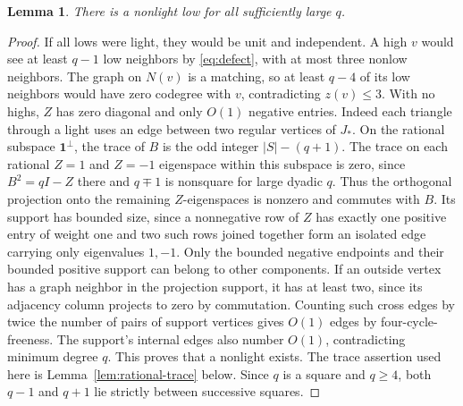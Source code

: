 \documentclass[11pt,reqno]{amsart}
\newtheorem{lemma}[theorem]{Lemma}
\theoremstyle{definition}
\theoremstyle{remark}
\numberwithin{equation}{section}
\begin{document}
\begin{lemma}\label{lem:nonlight}
There is a nonlight low for all sufficiently large \(q\).
\end{lemma}
\begin{proof} If all lows were light, they would be unit and independent. A high \(v\) would see at least \(q-1\) low neighbors by \eqref{eq:defect}, with at most three nonlow neighbors. The graph on \(N(v)\) is a matching, so at least \(q-4\) of its low neighbors would have zero codegree with \(v\), contradicting \(z(v)\le3\). With no highs, \(Z\) has zero diagonal and only \(O(1)\) negative entries. Indeed each triangle through a light uses an edge between two regular vertices of \(J_*\). On the rational subspace \(\mathbf1^\perp\), the trace of \(B\) is the odd integer \(|S|-(q+1)\). The trace on each rational \(Z=1\) and \(Z=-1\) eigenspace within this subspace is zero, since \(B^2=qI-Z\) there and \(q\mp1\) is nonsquare for large dyadic \(q\). Thus the orthogonal projection onto the remaining \(Z\)-eigenspaces is nonzero and commutes with \(B\). Its support has bounded size, since a nonnegative row of \(Z\) has exactly one positive entry of weight one and two such rows joined together form an isolated edge carrying only eigenvalues \(1,-1\). Only the bounded negative endpoints and their bounded positive support can belong to other components. If an outside vertex has a graph neighbor in the projection support, it has at least two, since its adjacency column projects to zero by commutation. Counting such cross edges by twice the number of pairs of support vertices gives \(O(1)\) edges by four-cycle-freeness. The support's internal edges also number \(O(1)\), contradicting minimum degree \(q\). This proves that a nonlight exists. The trace assertion used here is Lemma~\ref{lem:rational-trace}
below. Since \(q\) is a square and \(q\ge4\), both \(q-1\) and
\(q+1\) lie strictly between successive squares.
\end{proof}
\end{document}
